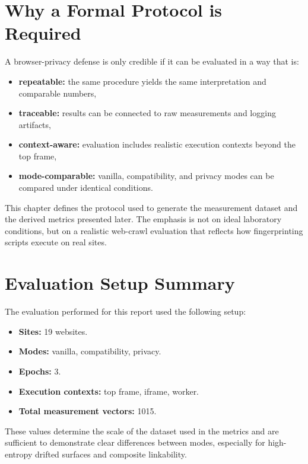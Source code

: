 \documentclass[11pt]{report}
\begin{document}
\section{Why a Formal Protocol is Required}

A browser-privacy defense is only credible if it can be evaluated in a way that is:

\begin{itemize}
    \item \textbf{repeatable:} the same procedure yields the same interpretation and comparable numbers,
    \item \textbf{traceable:} results can be connected to raw measurements and logging artifacts,
    \item \textbf{context-aware:} evaluation includes realistic execution contexts beyond the top frame,
    \item \textbf{mode-comparable:} vanilla, compatibility, and privacy modes can be compared under identical conditions.
\end{itemize}

This chapter defines the protocol used to generate the measurement dataset and the derived metrics presented later. The emphasis is not on ideal laboratory conditions, but on a realistic web-crawl evaluation that reflects how fingerprinting scripts execute on real sites.

\section{Evaluation Setup Summary}

The evaluation performed for this report used the following setup:

\begin{itemize}
    \item \textbf{Sites:} 19 websites.
    \item \textbf{Modes:} vanilla, compatibility, privacy.
    \item \textbf{Epochs:} 3.
    \item \textbf{Execution contexts:} top frame, iframe, worker.
    \item \textbf{Total measurement vectors:} 1015.
\end{itemize}

These values determine the scale of the dataset used in the metrics and are sufficient to demonstrate clear differences between modes, especially for high-entropy drifted surfaces and composite linkability.
\end{document}
